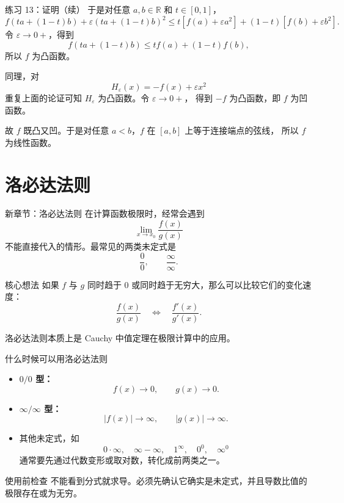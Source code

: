 \documentclass[aspectratio=169,11pt]{ctexbeamer}
\newcommand{\R}{\mathbb{R}}
\begin{document}
\begin{frame}{练习 13：证明（续）}
\small
于是对任意 $a,b\in\R$ 和 $t\in[0,1]$，
\[
  f(ta+(1-t)b)+\varepsilon(ta+(1-t)b)^2
  \le
  t[f(a)+\varepsilon a^2]+(1-t)[f(b)+\varepsilon b^2].
\]
令 $\varepsilon\to0+$，得到
\[
  f(ta+(1-t)b)\le t f(a)+(1-t)f(b),
\]
所以 $f$ 为凸函数。

同理，对
\[
  H_\varepsilon(x)=-f(x)+\varepsilon x^2
\]
重复上面的论证可知 $H_\varepsilon$ 为凸函数。令 $\varepsilon\to0+$，
得到 $-f$ 为凸函数，即 $f$ 为凹函数。

故 $f$ 既凸又凹。于是对任意 $a<b$，$f$ 在 $[a,b]$ 上等于连接端点的弦线，
所以 $f$ 为线性函数。
\end{frame}

\section{洛必达法则}

\begin{frame}{新章节：洛必达法则}
\small
在计算函数极限时，经常会遇到
\[
  \lim_{x\to x_0}\frac{f(x)}{g(x)}
\]
不能直接代入的情形。最常见的两类未定式是
\[
  \frac00,\qquad \frac{\infty}{\infty}.
\]

\begin{block}{核心想法}
如果 $f$ 与 $g$ 同时趋于 $0$ 或同时趋于无穷大，那么可以比较它们的变化速度：
\[
  \frac{f(x)}{g(x)}
  \quad\Longleftrightarrow\quad
  \frac{f'(x)}{g'(x)}.
\]
\end{block}

洛必达法则本质上是 Cauchy 中值定理在极限计算中的应用。
\end{frame}

\begin{frame}{什么时候可以用洛必达法则}
\small
\begin{itemize}
  \item \textbf{$0/0$ 型：}
  \[
    f(x)\to0,\qquad g(x)\to0.
  \]
  \item \textbf{$\infty/\infty$ 型：}
  \[
    |f(x)|\to\infty,\qquad |g(x)|\to\infty.
  \]
  \item 其他未定式，如
  \[
    0\cdot\infty,\quad \infty-\infty,\quad 1^\infty,\quad 0^0,\quad \infty^0
  \]
  通常要先通过代数变形或取对数，转化成前两类之一。
\end{itemize}

\begin{block}{使用前检查}
不能看到分式就求导。必须先确认它确实是未定式，并且导数比值的极限存在或为无穷。
\end{block}
\end{frame}
\end{document}
